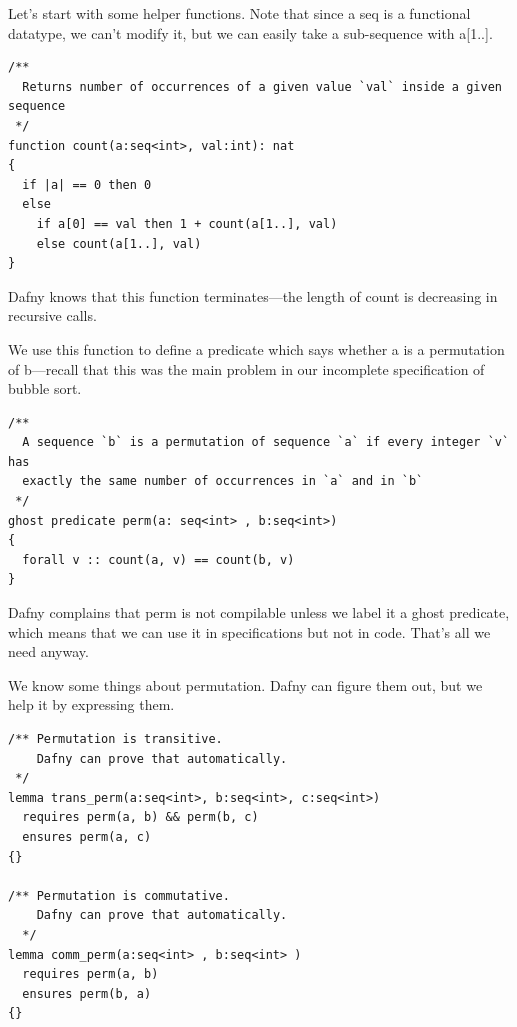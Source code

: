 \documentclass[11pt]{article}
\begin{document}
Let's start with some helper functions. Note that since a \textsf{seq} is a functional datatype, we can't
modify it, but we can easily take a sub-sequence with \textsf{a[1..]}.
\begin{lstlisting}[language=dafny]
/**
  Returns number of occurrences of a given value `val` inside a given sequence
 */
function count(a:seq<int>, val:int): nat
{
  if |a| == 0 then 0
  else
    if a[0] == val then 1 + count(a[1..], val)
    else count(a[1..], val)
}
\end{lstlisting}
Dafny knows that this function terminates---the length of \textsf{count} is decreasing in recursive calls.

We use this function to define a predicate which says whether \textsf{a} is a permutation of \textsf{b}---recall
that this was the main problem in our incomplete specification of bubble sort.
\begin{lstlisting}[language=dafny]
/**
  A sequence `b` is a permutation of sequence `a` if every integer `v` has
  exactly the same number of occurrences in `a` and in `b`
 */
ghost predicate perm(a: seq<int> , b:seq<int>)
{
  forall v :: count(a, v) == count(b, v)
}
\end{lstlisting}
Dafny complains that \textsf{perm} is not compilable unless we label it a \textsf{ghost} predicate, which means
that we can use it in specifications but not in code. That's all we need anyway.

We know some things about permutation. Dafny can figure them out, but we help it by expressing them.
\begin{lstlisting}[language=dafny]
/** Permutation is transitive.
    Dafny can prove that automatically.
 */
lemma trans_perm(a:seq<int>, b:seq<int>, c:seq<int>)
  requires perm(a, b) && perm(b, c)
  ensures perm(a, c)
{}

/** Permutation is commutative.
    Dafny can prove that automatically.
  */
lemma comm_perm(a:seq<int> , b:seq<int> )
  requires perm(a, b)
  ensures perm(b, a)
{}
\end{lstlisting}

\end{document}
